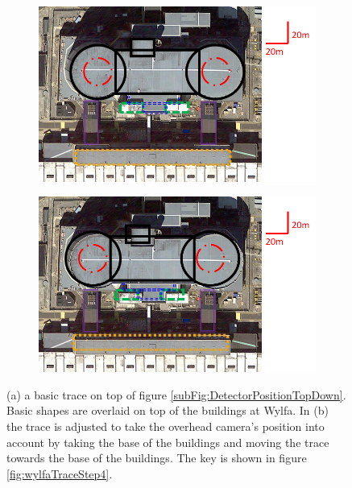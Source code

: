 \begin{figure}[!h]
\centering
\begin{subfigure}{.5\textwidth}
  \centering
  \includegraphics[width=\linewidth]{Chapter6/Figs/wylfaTraceStep1NoLeg.png}
  \captionsetup{width=.9\linewidth}
  \caption{}
  \label{subFig:wylfaTraceStep1}
\end{subfigure}%
\begin{subfigure}{.5\textwidth}
  \centering
\includegraphics[width=\linewidth]{Chapter6/Figs/wylfaTraceStep2NoLeg.png}
  \captionsetup{width=.9\linewidth}
  \caption{}
  \label{subFig:wylfaTraceStep2}
\end{subfigure}
\caption{(a) a basic trace on top of figure \ref{subFig:DetectorPositionTopDown}. Basic shapes are overlaid on top of the buildings at Wylfa. In (b) the trace is adjusted to take the overhead camera's position into account by taking the base of the buildings and moving the trace towards the base of the buildings. The key is shown in figure \ref{fig:wylfaTraceStep4}.}
\label{fig:wylfaTraceSteps1-2}
\end{figure}

